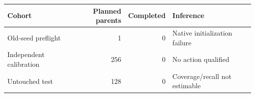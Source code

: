 \begin{tabular}{lrrl}\hline
Cohort & Planned parents & Completed & Inference\\\hline
Old-seed preflight & 1 & 0 & Native initialization failure\\
Independent calibration & 256 & 0 & No action qualified\\
Untouched test & 128 & 0 & Coverage/recall not estimable\\\hline
\end{tabular}
